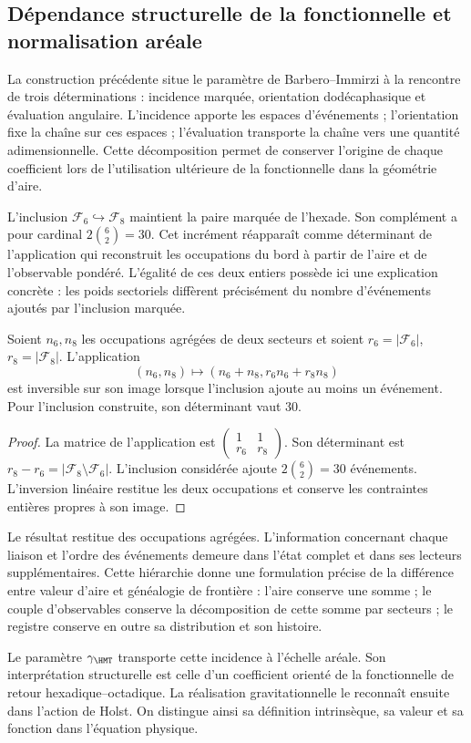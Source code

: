 \subsection{Dépendance structurelle de la fonctionnelle et normalisation aréale}

La construction précédente situe le paramètre de Barbero--Immirzi à la
rencontre de trois déterminations : incidence marquée, orientation
dodécaphasique et évaluation angulaire. L'incidence apporte les espaces
d'événements ; l'orientation fixe la chaîne sur ces espaces ;
l'évaluation transporte la chaîne vers une quantité adimensionnelle. Cette
décomposition permet de conserver l'origine de chaque coefficient lors de
l'utilisation ultérieure de la fonctionnelle dans la géométrie d'aire.

L'inclusion \(\mathcal F_6\hookrightarrow\mathcal F_8\) maintient
la paire marquée de l'hexade. Son complément a pour cardinal
\(2\binom62=30\). Cet incrément réapparaît comme déterminant de
l'application qui reconstruit les occupations du bord à partir de l'aire et
de l'observable pondéré. L'égalité de ces deux entiers possède ici
une explication concrète : les poids sectoriels diffèrent précisément
du nombre d'événements ajoutés par l'inclusion marquée.

\begin{proposition}
Soient \(n_6,n_8\) les occupations agrégées de deux secteurs et soient
\(r_6=|\mathcal F_6|\), \(r_8=|\mathcal F_8|\). L'application
\[
 (n_6,n_8)\longmapsto(n_6+n_8,r_6n_6+r_8n_8)
\]
est inversible sur son image lorsque l'inclusion ajoute au moins un
événement. Pour l'inclusion construite, son déterminant vaut 30.
\end{proposition}
\begin{proof}
La matrice de l'application est
\(\left(\begin{smallmatrix}1&1\\r_6&r_8\end{smallmatrix}\right)\).
Son déterminant est \(r_8-r_6=|\mathcal F_8\setminus\mathcal F_6|\).
L'inclusion considérée ajoute \(2\binom62=30\) événements. L'inversion
linéaire restitue les deux occupations et conserve les contraintes entières
propres à son image.
\end{proof}

Le résultat restitue des occupations agrégées. L'information concernant
chaque liaison et l'ordre des événements demeure dans l'état complet
et dans ses lecteurs supplémentaires. Cette hiérarchie donne une formulation
précise de la différence entre valeur d'aire et généalogie de frontière :
l'aire conserve une somme ; le couple d'observables conserve la
décomposition de cette somme par secteurs ; le registre conserve en outre
sa distribution et son histoire.

Le paramètre \(\gamma_{\HMT}\) transporte cette incidence à l'échelle
aréale. Son interprétation structurelle est celle d'un coefficient orienté
de la fonctionnelle de retour hexadique--octadique. La réalisation gravitationnelle
le reconnaît ensuite dans l'action de Holst. On distingue ainsi sa
définition intrinsèque, sa valeur et sa fonction dans l'équation physique.
